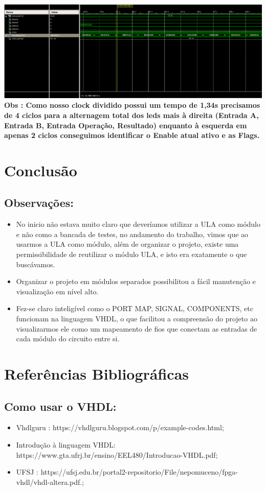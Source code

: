\documentclass[11pt]{book}
\begin{document}
\includegraphics[width=1.1\textwidth]{Porta_XOR.png}%
\newline\newline
\textbf{Obs : Como nosso clock dividido possui um tempo de 1,34s precisamos de 4 ciclos para a alternagem total dos leds mais à direita (Entrada A, Entrada B, Entrada Operação, Resultado) enquanto à esquerda em apenas 2 ciclos conseguimos identificar o Enable atual ativo e as Flags.}  

        \chapter{Conclusão}
        \section{Observações:}
        \begin{itemize}
            \item No inicio não estava muito claro que deveríamos utilizar a ULA como módulo e não como a bancada de testes, no andamento do trabalho, vimos que ao usarmos a ULA como módulo, além de organizar o projeto, existe uma permissibilidade de reutilizar o módulo ULA, e isto era exatamente o que buscávamos.
            \item Organizar o projeto em módulos separados possibilitou a fácil manutenção e visualização em nível alto. 
            \item Fez-se claro inteligível como o PORT MAP, SIGNAL, COMPONENTS, etc funcionam na linguagem VHDL, o que facilitou a compreensão do projeto ao visualizarmos ele como um mapeamento de fios que conectam as entradas de cada módulo do circuito entre si. 
        \end{itemize}

        
    \chapter{Referências Bibliográficas}
        \section{Como usar o VHDL:}
        \begin{itemize}
            \item Vhdlguru : https://vhdlguru.blogspot.com/p/example-codes.html;
            \item Introdução à linguagem VHDL: https://www.gta.ufrj.br/ensino/EEL480/Introducao-VHDL.pdf;
            \item UFSJ : https://ufsj.edu.br/portal2-repositorio/File/nepomuceno/fpga-vhdl/vhdl-altera.pdf.;
      \end{itemize}
\end{document}
